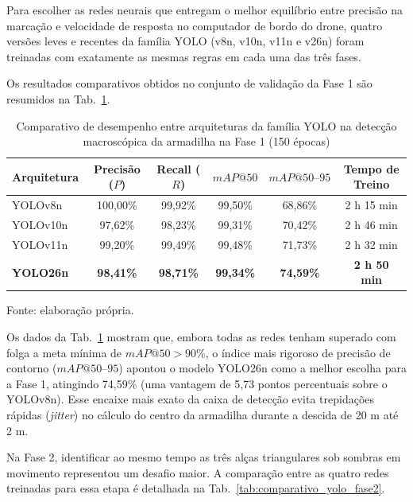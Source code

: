 Para escolher as redes neurais que entregam o melhor equilíbrio entre precisão na marcação e velocidade de resposta no computador de bordo do drone, quatro versões leves e recentes da família YOLO (v8n, v10n, v11n e v26n) foram treinadas com exatamente as mesmas regras em cada uma das três fases.

Os resultados comparativos obtidos no conjunto de validação da Fase 1 são resumidos na Tab.~\ref{tab:comparativo_yolo_fase1}.

\begin{table}[H]
	\centering
	\small
	\setlength{\tabcolsep}{5pt}
	\captionsetup{justification=centering}
	\caption{Comparativo de desempenho entre arquiteturas da família YOLO na detecção macroscópica da armadilha na Fase 1 (150 épocas)}
	\label{tab:comparativo_yolo_fase1}
	\vspace{0.2cm}
	\begin{tabular}{lccccc}
		\hline
		\textbf{Arquitetura} & \textbf{Precisão ($P$)} & \textbf{Recall ($R$)} & \textbf{$mAP@50$} & \textbf{$mAP@50\text{--}95$} & \textbf{Tempo de Treino} \\
		\hline
		YOLOv8n  & 100,00\% & 99,92\% & 99,50\% & 68,86\% & 2 h 15 min \\
		YOLOv10n & 97,62\%  & 98,23\% & 99,31\% & 70,42\% & 2 h 46 min \\
		YOLOv11n & 99,20\%  & 99,49\% & 99,48\% & 71,73\% & 2 h 32 min \\
		\textbf{YOLO26n} & \textbf{98,41\%} & \textbf{98,71\%} & \textbf{99,34\%} & \textbf{74,59\%} & \textbf{2 h 50 min} \\
		\hline
	\end{tabular}
	\vspace{0.2cm}
	\begin{flushleft}
		\footnotesize Fonte: elaboração própria.
	\end{flushleft}
\end{table}

Os dados da Tab.~\ref{tab:comparativo_yolo_fase1} mostram que, embora todas as redes tenham superado com folga a meta mínima de $mAP@50 > 90\%$, o índice mais rigoroso de precisão de contorno ($mAP@50\text{--}95$) apontou o modelo YOLO26n como a melhor escolha para a Fase 1, atingindo 74,59\% (uma vantagem de 5,73 pontos percentuais sobre o YOLOv8n). Esse encaixe mais exato da caixa de detecção evita trepidações rápidas (\textit{jitter}) no cálculo do centro da armadilha durante a descida de 20 m até 2 m.

Na Fase 2, identificar ao mesmo tempo as três alças triangulares sob sombras em movimento representou um desafio maior. A comparação entre as quatro redes treinadas para essa etapa é detalhada na Tab.~\ref{tab:comparativo_yolo_fase2}.

